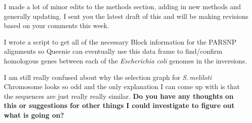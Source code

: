\documentclass[12pt]{article}
\newcommand{\smel}{\textit{S.\,meliloti}\xspace}
\newcommand{\p}{progressiveMauve\xspace}
\newcommand{\strep}{\textit{Streptomyces}\xspace}
\newcommand{\ecol}{\textit{E.\,coli}\xspace}
\newcommand{\ecoli}{\textit{Escherichia coli}\xspace}
\newcommand{\pa}{pSymA\xspace}
\newcommand{\dn}{\textit{dN}\xspace}
\begin{document}
I made a lot of minor edits to the methods section, adding in new methods and generally updating. I sent you the latest draft of this and will be making revisions based on your comments this week.

I wrote a script to get all of the necessary Block information for the PARSNP alignments so Queenie can eventually use this data frame to find/confirm homologous genes between each of the \ecoli genomes in the inversions. 


I am still really confused about why the selection graph for \smel Chromosome looks so odd and the only explanation I can come up with is that the sequences are just really really similar. \textbf{Do you have any thoughts on this or suggestions for other things I could investigate to figure out what is going on?}
\end{document}
